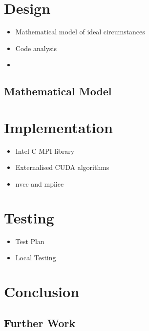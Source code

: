 \documentclass[conference]{IEEEtran}
\begin{document}


\section{Design}

\begin{itemize}
    \item Mathematical model of ideal circumstances
    \item Code analysis
    \item 
\end{itemize}

\subsection{Mathematical Model}





\section{Implementation}

\begin{itemize}
    \item Intel C MPI library
    \item Externalised CUDA algorithms
    \item nvcc and mpiicc
\end{itemize}


\section{Testing}

\begin{itemize}
    \item Test Plan
    \item Local Testing
\end{itemize}



\section{Conclusion}


\subsection{Further Work}




\end{document}
